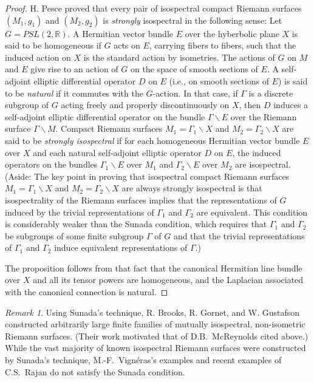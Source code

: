 \documentclass[12pt,leqno]{amsart}%
\theoremstyle{definition}
\theoremstyle{remark}
\newtheorem{remark}[theorem]{Remark}
\numberwithin{equation}{section}
\def\R{{\mathbb{R}}}
\def\G{{\Gamma}}
\def\bs{{\backslash}}
\begin{document}
\begin{proof}
H. Pesce \cite{Pes} proved that every pair of isospectral compact
Riemann surfaces $(M_1,g_1)$ and $(M_2,g_2)$ is \emph{strongly} isospectral in
the following sense:  Let $G=PSL(2,\R)$.  A Hermitian vector bundle $E$ over the
hyberbolic plane $X$ is said to be homogeneous if $G$ acts on $E$, carrying
fibers to fibers, such that the induced action on $X$ is the standard action by
isometries.  The actions of $G$ on $M$ and $E$ give rise to an action of $G$ on
the space of smooth sections of $E$.  A self-adjoint elliptic differential
operator $D$ on $E$ (i.e., on smooth sections of $E$) is said to be
\emph{natural} if it commutes with the $G$-action.  In that case, if $\G$ is a
discrete subgroup of $G$ acting freely and properly discontinuously on $X$, then
$D$ induces a self-adjoint elliptic differential operator on the bundle $\G\bs
E$ over the Riemann surface $\G\bs M$.  Compact Riemann surfaces $M_1=\G_1\bs X$
and $M_2=\G_2\bs X$ are said to be \emph{strongly isospectral} if for each
homogeneous Hermitian vector bundle $E$ over $X$ and each natural self-adjoint
elliptic operator $D$ on $E$, the induced operators on the bundles $\G_1\bs E$
over $M_1$ and $\G_2\bs E$ over $M_2$ are isospectral.   (Aside:  The key point
in proving that isospectral compact Riemann surfaces $M_1=\G_1\bs X$ and
$M_2=\G_2\bs X$ are always strongly isospectral is that isospectrality of the
Riemann surfaces implies that the representations of $G$ induced by the trivial
representations of $\G_1$ and $\G_2$ are equivalent.  This condition is
considerably weaker than the Sunada condition, which requires that $\G_1$ and
$\G_2$ be subgroups of some finite subgroup $\G$ of $G$ and that the trivial
representations of $\G_1$ and $\G_2$ induce equivalent representations of $\G$.)

The proposition follows from that fact that the canonical Hermitian line bundle
over $X$ and all its tensor powers are homogeneous, and the Laplacian associated
with the canonical connection is natural.
\end{proof}

\begin{remark}  Using Sunada's technique, R. Brooks, R. Gornet, and W. Gustafson
\cite{BGG} constructed arbitrarily large finite families of mutually
isospectral, non-isometric Riemann surfaces.  (Their work motivated that of
D.B.~McReynolds cited above.)  While the vast majority of known isospectral
Riemann surfaces were constructed by Sunada's technique, M.-F.~Vign\'eras's
examples  \cite{V} and recent examples of  C.S.~Rajan \cite{R} do not satisfy
the Sunada condition.
\end{remark}
\end{document}
